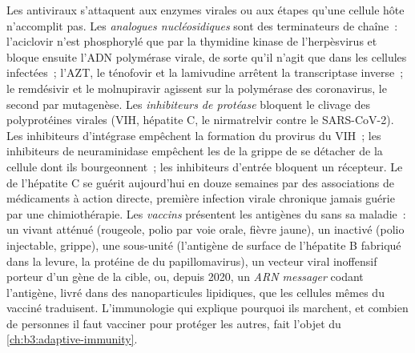 \begin{definition}\label{def:b3:virology:drugs}
Les antiviraux s'attaquent aux enzymes virales ou aux étapes qu'une
cellule hôte n'accomplit pas. Les \emph{analogues nucléosidiques} sont
des terminateurs de chaîne~: l'aciclovir n'est phosphorylé que par la
thymidine kinase de l'herpèsvirus et bloque ensuite l'ADN polymérase
virale, de sorte qu'il n'agit que dans les cellules infectées~; l'AZT,
le ténofovir et la lamivudine arrêtent la transcriptase inverse~; le
remdésivir et le molnupiravir agissent sur la polymérase des
coronavirus, le second par mutagenèse. Les \emph{inhibiteurs de
protéase} bloquent le clivage des polyprotéines virales (VIH,
hépatite C, le nirmatrelvir contre le SARS-CoV-2). Les inhibiteurs
d'intégrase empêchent la formation du provirus du VIH~; les inhibiteurs
de neuraminidase empêchent les  de la grippe de se détacher de
la cellule dont ils bourgeonnent~; les inhibiteurs d'entrée bloquent un
récepteur. Le  de l'hépatite C se guérit aujourd'hui en douze
semaines par des associations de médicaments à action directe, première
infection virale chronique jamais guérie par une chimiothérapie. Les
\emph{vaccins} présentent les antigènes du  sans sa maladie~: un
 vivant atténué (rougeole, polio par voie orale, fièvre jaune), un
 inactivé (polio injectable, grippe), une sous-unité (l'antigène
de surface de l'hépatite B fabriqué dans la levure, la protéine de
 du papillomavirus), un vecteur viral inoffensif porteur d'un
gène de la cible, ou, depuis 2020, un \emph{ARN messager} codant
l'antigène, livré dans des nanoparticules lipidiques, que les cellules
mêmes du vacciné traduisent. L'immunologie qui explique pourquoi ils
marchent, et combien de personnes il faut vacciner pour protéger les
autres, fait l'objet du \cref{ch:b3:adaptive-immunity}.
\end{definition}

